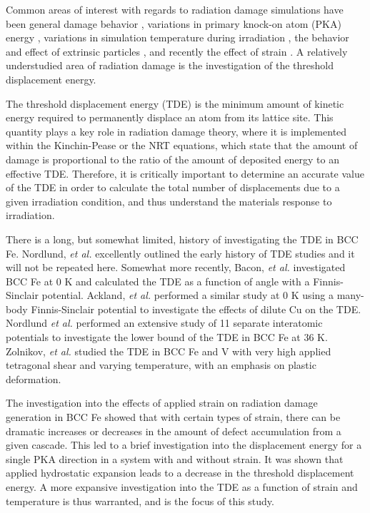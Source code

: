 \documentclass[review]{elsarticle}
\begin{document}
Common areas of interest with regards to radiation damage simulations have been general damage behavior \cite{averback1998, phythian1995, bacon1994}, variations in primary knock-on atom (PKA) energy \cite{caturla2000, zinkle1993}, variations in simulation temperature during irradiation \cite{gao1997, phythian1995, soneda1998, bacon2004}, the behavior and effect of extrinsic particles \cite{hayward2010, ackland2004, terentyev2006}, and recently the effect of strain \cite{beeler2015, miyashiro2011, di2013}.  A relatively understudied area of radiation damage is the investigation of the threshold displacement energy.

The threshold displacement energy (TDE) is the minimum amount of kinetic energy required to permanently displace an atom from its lattice site.  This quantity plays a key role in radiation damage theory, where it is implemented within the Kinchin-Pease \cite{kinchinpease} or the NRT \cite{norgett1975} equations, which state that the amount of damage is proportional to the ratio of the amount of deposited energy to an effective TDE.  Therefore, it is critically important to determine an accurate value of the TDE in order to calculate the total number of displacements due to a given irradiation condition, and thus understand the materials response to irradiation.

There is a long, but somewhat limited, history of investigating the TDE in BCC Fe.  Nordlund, \textit{et al.} \cite{nordlund2006} excellently outlined the early history of TDE studies and it will not be repeated here.  Somewhat more recently, Bacon, \textit{et al.} \cite{bacon1993} investigated BCC Fe at 0 K and calculated the TDE as a function of angle with a Finnis-Sinclair potential.  Ackland, \textit{et al.} \cite{ackland1997} performed a similar study at 0 K using a many-body Finnis-Sinclair potential to investigate the effects of dilute Cu on the TDE.  Nordlund \textit{et al.} \cite{nordlund2006} performed an extensive study of 11 separate interatomic potentials to investigate the lower bound of the TDE in BCC Fe at 36 K.  Zolnikov, \textit{et al.} \cite{zolnikov2015} studied the TDE in BCC Fe and V with very high applied tetragonal shear and varying temperature, with an emphasis on plastic deformation.  

The investigation into the effects of applied strain on radiation damage generation in BCC Fe \cite{beeler2015} showed that with certain types of strain, there can be dramatic increases or decreases in the amount of defect accumulation from a given cascade.  This led to a brief investigation into the displacement energy for a single PKA direction in a system with and without strain.  It was shown that applied hydrostatic expansion leads to a decrease in the threshold displacement energy.  A more expansive investigation into the TDE as a function of strain and temperature is thus warranted, and is the focus of this study.
\end{document}
